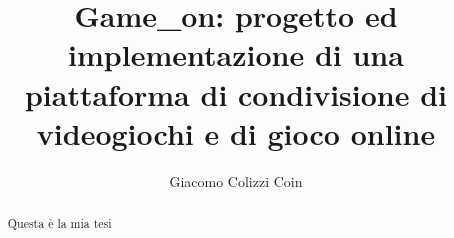 \documentclass[binding=0.6cm,Lau]{sapthesis}
\title{Game\_on: progetto ed implementazione di una piattaforma di condivisione di videogiochi e di gioco online}
\author{Giacomo Colizzi Coin}
\begin{document}
\frontmatter
\maketitle

\begin{abstract}
Questa è la mia tesi
\end{abstract}

\tableofcontents

\mainmatter





\backmatter
\cleardoublepage
{}
{}
	
\end{document}
